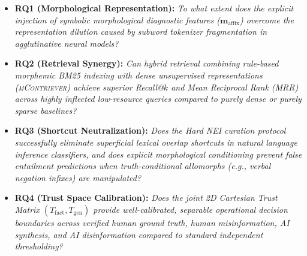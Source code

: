 \begin{itemize}[leftmargin=*, label=$\blacktriangleright$]
    \item \textbf{RQ1 (Morphological Representation):} \textit{To what extent does the explicit injection of symbolic morphological diagnostic features ($\mathbf{m}_{\text{affix}}$) overcome the representation dilution caused by subword tokenizer fragmentation in agglutinative neural models?}
    \item \textbf{RQ2 (Retrieval Synergy):} \textit{Can hybrid retrieval combining rule-based morphemic BM25 indexing with dense unsupervised representations (\textsc{mContriever}) achieve superior Recall@$k$ and Mean Reciprocal Rank (MRR) across highly inflected low-resource queries compared to purely dense or purely sparse baselines?}
    \item \textbf{RQ3 (Shortcut Neutralization):} \textit{Does the Hard NEI curation protocol successfully eliminate superficial lexical overlap shortcuts in natural language inference classifiers, and does explicit morphological conditioning prevent false entailment predictions when truth-conditional allomorphs (e.g., verbal negation infixes) are manipulated?}
    \item \textbf{RQ4 (Trust Space Calibration):} \textit{Does the joint 2D Cartesian Trust Matrix $(T_{\text{fact}}, T_{\text{gen}})$ provide well-calibrated, separable operational decision boundaries across verified human ground truth, human misinformation, AI synthesis, and AI disinformation compared to standard independent thresholding?}
\end{itemize}
